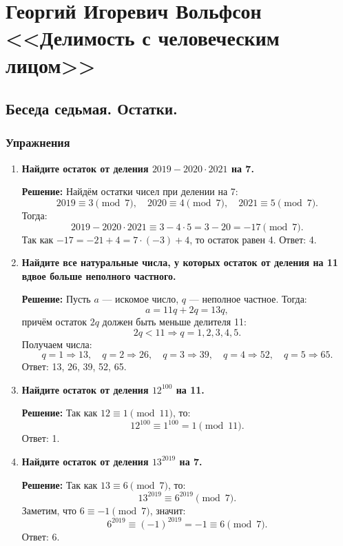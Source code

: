\documentclass[12pt, a4paper]{article}
\begin{document}
\section*{Георгий Игоревич Вольфсон <<Делимость с человеческим лицом>>}

\subsection*{Беседа седьмая. Остатки.}

\subsubsection*{Упражнения}

\begin{enumerate}[label=\arabic*., wide=0pt, leftmargin=*]

\item \textbf{Найдите остаток от деления \(2019 - 2020 \cdot 2021\) на 7.}

\textbf{Решение:}
Найдём остатки чисел при делении на 7:
\[
2019 \equiv 3 \pmod{7},\quad 2020 \equiv 4 \pmod{7},\quad 2021 \equiv 5 \pmod{7}.
\]
Тогда:
\[
2019 - 2020 \cdot 2021 \equiv 3 - 4 \cdot 5 = 3 - 20 = -17 \pmod{7}.
\]
Так как \(-17 = -21 + 4 = 7 \cdot (-3) + 4\), то остаток равен 4.
Ответ: 4.

\item \textbf{Найдите все натуральные числа, у которых остаток от деления на 11 вдвое больше неполного частного.}

\textbf{Решение:}
Пусть \(a\) — искомое число, \(q\) — неполное частное. Тогда:
\[
a = 11q + 2q = 13q,
\]
причём остаток \(2q\) должен быть меньше делителя 11:
\[
2q < 11 \Rightarrow q = 1,2,3,4,5.
\]
Получаем числа:
\[
q=1 \Rightarrow 13,\quad q=2 \Rightarrow 26,\quad q=3 \Rightarrow 39,\quad q=4 \Rightarrow 52,\quad q=5 \Rightarrow 65.
\]
Ответ: 13, 26, 39, 52, 65.

\item \textbf{Найдите остаток от деления \(12^{100}\) на 11.}

\textbf{Решение:}
Так как \(12 \equiv 1 \pmod{11}\), то:
\[
12^{100} \equiv 1^{100} = 1 \pmod{11}.
\]
Ответ: 1.

\item \textbf{Найдите остаток от деления \(13^{2019}\) на 7.}

\textbf{Решение:}
Так как \(13 \equiv 6 \pmod{7}\), то:
\[
13^{2019} \equiv 6^{2019} \pmod{7}.
\]
Заметим, что \(6 \equiv -1 \pmod{7}\), значит:
\[
6^{2019} \equiv (-1)^{2019} = -1 \equiv 6 \pmod{7}.
\]
Ответ: 6.


\end{enumerate}
\end{document}
